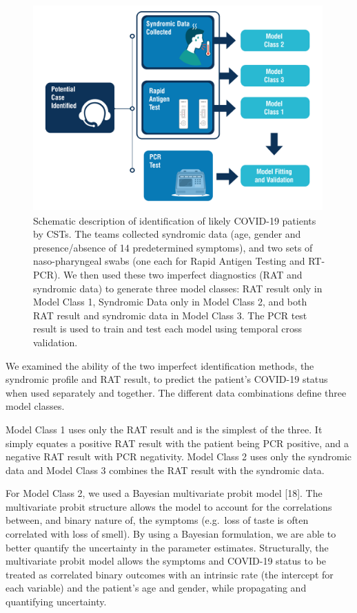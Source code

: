 \documentclass[]{elsarticle} %
\begin{document}
\begin{figure}
\hypertarget{fig:data-flowchart}{%
\centering
\includegraphics[width=4.375in,height=3.10417in]{MainTextFigs/DataFlowchart.pdf}
\caption{Schematic description of identification of likely COVID-19
patients by CSTs. The teams collected syndromic data (age, gender and
presence/absence of 14 predetermined symptoms), and two sets of
naso-pharyngeal swabs (one each for Rapid Antigen Testing and RT-PCR).
We then used these two imperfect diagnostics (RAT and syndromic data) to
generate three model classes: RAT result only in Model Class 1,
Syndromic Data only in Model Class 2, and both RAT result and syndromic
data in Model Class 3. The PCR test result is used to train and test
each model using temporal cross validation.}\label{fig:data-flowchart}
}
\end{figure}

We examined the ability of the two imperfect identification methods, the
syndromic profile and RAT result, to predict the patient's COVID-19
status when used separately and together. The different data
combinations define three model classes.

Model Class 1 uses only the RAT result and is the simplest of the three.
It simply equates a positive RAT result with the patient being PCR
positive, and a negative RAT result with PCR negativity. Model Class 2
uses only the syndromic data and Model Class 3 combines the RAT result
with the syndromic data.

For Model Class 2, we used a Bayesian multivariate probit model
{[}18{]}. The multivariate probit structure allows the model to account
for the correlations between, and binary nature of, the symptoms
(e.g.~loss of taste is often correlated with loss of smell). By using a
Bayesian formulation, we are able to better quantify the uncertainty in
the parameter estimates. Structurally, the multivariate probit model
allows the symptoms and COVID-19 status to be treated as correlated
binary outcomes with an intrinsic rate (the intercept for each variable)
and the patient's age and gender, while propagating and quantifying
uncertainty.
\end{document}
